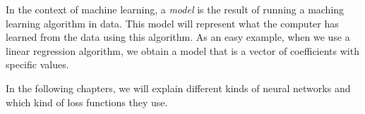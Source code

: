 In the context of machine learning, a \emph{model} is the result of running a maching learning algorithm in data. This model will represent what the computer has learned from the data using this algorithm. As an easy example, when we use a
linear regression algorithm, we obtain a model that is a vector of coefficients with specific values.

In the following chapters, we will explain different kinds of neural networks and which kind of loss functions they use. 


